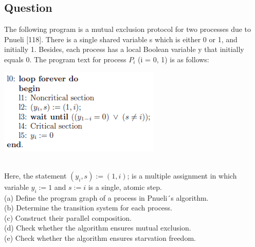 \documentclass[12pt]{article}
\begin{document}
\subsection*{Question}
The following program is a mutual exclusion protocol for two processes due to
Pnueli [118]. There is a single shared variable s which is either 0 or 1, and initially 1. Besides,
each process has a local Boolean variable y that initially equals 0. The program text for process
$P_i$ (i = 0, 1) is as follows:\\
\begin{centering}
	\includegraphics*[scale=1]{ex25.png}
\end{centering}\\
Here, the statement $(y_i, s) := (1, i)$; is a multiple assignment in which variable $y_i := 1$ and $s := i$
is a single, atomic step.\\
(a) Define the program graph of a process in Pnueli´s algorithm.\\
(b) Determine the transition system for each process.\\
(c) Construct their parallel composition.\\
(d) Check whether the algorithm ensures mutual exclusion.\\
(e) Check whether the algorithm ensures starvation freedom.\\
\end{document}
